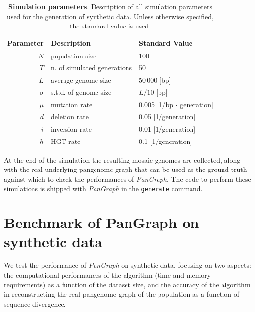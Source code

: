 \documentclass[aps,rmp,reprint,superscriptaddress,notitlepage,10pt,onecolumn]{revtex4-1}
\begin{document}
\begin{table}[hb]
    \setlength{\tabcolsep}{9pt}
    \begin{tabular}{r l l}
        \hline\hline
        Parameter & Description                 & Standard Value                  \\
        \hline
        $N$       & population size             & 100                             \\
        $T$       & n. of simulated generations & 50                              \\
        $L$       & average genome size         & $50\, 000$ [bp]                 \\
        $\sigma$  & s.t.d. of genome size       & $L/10$ [bp]                     \\
        $\mu$     & mutation rate               & 0.005 [1/bp $\cdot$ generation] \\
        $d$       & deletion rate               & 0.05 [1/generation]             \\
        $i$       & inversion rate              & 0.01 [1/generation]             \\
        $h$       & HGT rate                    & 0.1 [1/generation]              \\
        \hline
    \end{tabular}
    \caption{{\bf Simulation parameters}. Description of all simulation parameters used for the generation of synthetic data. Unless otherwise specified, the standard value is used.}
    \label{table:sim-params}
\end{table}

At the end of the simulation the resulting mosaic genomes are collected, along with the real underlying pangenome graph that can be used as the ground truth against which to check the performances of \textit{PanGraph}. The code to perform these simulations is shipped with \textit{PanGraph} in the \verb|generate| command.

\section{Benchmark of PanGraph on synthetic data}

We test the performance of \textit{PanGraph} on synthetic data, focusing on two aspects: the computational performances of the algorithm (time and memory requirements) as a function of the dataset size, and the accuracy of the algorithm in reconstructing the real pangenome graph of the population as a function of sequence divergence.
\end{document}
